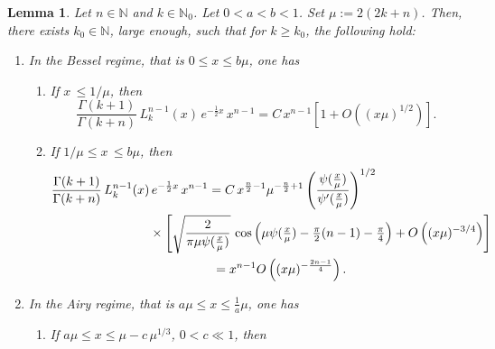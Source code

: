 \documentclass[11pt, reqno]{amsart}
\theoremstyle{plain}
\newtheorem{lemma}[theorem]{Lemma}
\theoremstyle{remark}
\theoremstyle{example}
\theoremstyle{definition}
\numberwithin{equation}{section}
\begin{document}
\begin{lemma}\label{Laguerre-Asymp-Our-setup}
    Let $n \in \mathbb{N}$ and $k \in \mathbb{N}_{0}$. Let $0 < a < b < 1$. Set $\mu := 2 (2k +n)$. Then, there exists $k_{0} \in \mathbb{N}$, large enough, such that for $k \geq k_{0}$, the following hold: 
    \begin{enumerate}
        \item[\emph{(1)}] In the Bessel regime, that is $0 \leq x \leq b \mu$, one has
    \begin{enumerate}
 \item [\emph{(\emph{a})}] \hspace*{.7mm} If $x \,  \leq 1/ \mu$, then
    \begin{equation} \label{less than q by mu}
        \frac{\Gamma(k+1)}{\Gamma(k+n)} \,  L^{n-1}_{k}(x) \, e^{- \frac{1}{2} x} \,  x^{n-1} = C \,  x^{n-1} \left[1 + O \left(  (x \mu )^{1/2} \right) \right].
    \end{equation}  
 \item [\emph{(\emph{b})}] \hspace*{.7mm} If $ 1 / \mu \leq x \, \leq b \mu$, then
    \begin{equation}\label{1 by mu to mu}
       \begin{split}
            \frac{\Gamma(k+1)}{\Gamma(k+n)} \,  L^{n-1}_{k}(x) &  \, e^{- \frac{1}{2} x} \,  x^{n-1} = C \, x^{\frac{n}{2}-1} \mu^{-\frac{n}{2}+1}  \left( \frac{  \psi( \frac{x}{\mu} )  }{  \psi^{ \prime} ( \frac{x}{\mu} )  }  \right)^{1/2} \\
            & \times \left[  \sqrt{  \frac{2}{ \pi \mu \psi({\textstyle\frac{x}{\mu}})}      } \, \cos \left(  \mu \psi(\textstyle\frac{x}{\mu}) - \frac{\pi}{2}(n-1) - \frac{\pi}{4}      \right) + O \left(  (x \mu )^{-3/4} \right) \right]\\
           & \hspace*{5em}= x^{n-1} O \left(  (x \mu )^{-\frac{2n-1}{4}} \right).
       \end{split}
    \end{equation}      
    \end{enumerate}
     \item[\emph{(2)}] In the Airy regime, that is $a \mu \leq x \leq \frac{1}{a} \mu$,  one has
     \begin{enumerate}
 \item [\emph{(\emph{a})}] \hspace*{.7mm} If $ a \mu \leq x \leq  \mu - c \, \mu^{1/3}$, $0 < c \ll 1$, then    
 \begin{equation} \label{Bessel-Airy interface}

\end{equation}
\end{enumerate}
\end{enumerate}
\end{lemma}
\end{document}
